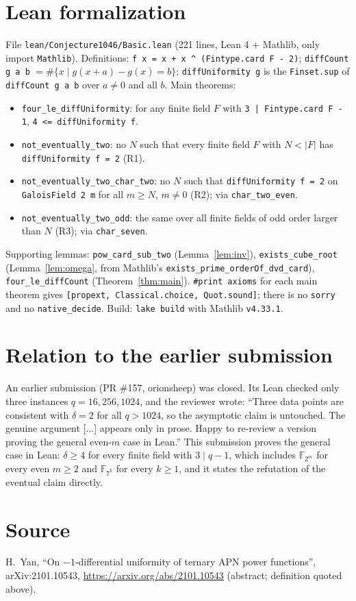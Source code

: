 \documentclass[11pt]{article}
\theoremstyle{definition}
\begin{document}
\section{Lean formalization}
File \texttt{lean/Conjecture1046/Basic.lean} (221 lines, Lean 4 + Mathlib, only import
\texttt{Mathlib}). Definitions: \texttt{f x = x + x \^{} (Fintype.card F - 2)};
\texttt{diffCount g a b} $=\#\{x\mid g(x+a)-g(x)=b\}$; \texttt{diffUniformity g} is the
\texttt{Finset.sup} of \texttt{diffCount g a b} over $a\ne0$ and all $b$. Main theorems:
\begin{itemize}
\item \texttt{four\_le\_diffUniformity}: for any finite field $F$ with
  \texttt{3 | Fintype.card F - 1}, \texttt{4 <= diffUniformity f}.
\item \texttt{not\_eventually\_two}: no $N$ such that every finite field $F$ with $N<|F|$ has
  \texttt{diffUniformity f = 2} (R1).
\item \texttt{not\_eventually\_two\_char\_two}: no $N$ such that \texttt{diffUniformity f = 2} on
  \texttt{GaloisField 2 m} for all $m\ge N$, $m\ne0$ (R2); via \texttt{char\_two\_even}.
\item \texttt{not\_eventually\_two\_odd}: the same over all finite fields of odd order larger than
  $N$ (R3); via \texttt{char\_seven}.
\end{itemize}
Supporting lemmas: \texttt{pow\_card\_sub\_two} (Lemma~\ref{lem:inv}), \texttt{exists\_cube\_root}
(Lemma~\ref{lem:omega}, from Mathlib's \texttt{exists\_prime\_orderOf\_dvd\_card}),
\texttt{four\_le\_diffCount} (Theorem~\ref{thm:main}). \texttt{\#print axioms} for each main
theorem gives \texttt{[propext, Classical.choice, Quot.sound]}; there is no \texttt{sorry} and
no \texttt{native\_decide}. Build: \texttt{lake build} with Mathlib \texttt{v4.33.1}.

\section{Relation to the earlier submission}
An earlier submission (PR \#157, orionsheep) was closed. Its Lean checked only three instances
$q=16,256,1024$, and the reviewer wrote: ``Three data points are consistent with $\delta = 2$ for
all $q > 1024$, so the asymptotic claim is untouched. The genuine argument [...] appears only in
prose. Happy to re-review a version proving the general even-$m$ case in Lean.'' This submission
proves the general case in Lean: $\delta\ge4$ for every finite field with $3\mid q-1$, which
includes $\mathbb F_{2^m}$ for every even $m\ge2$ and $\mathbb F_{7^k}$ for every $k\ge1$, and it
states the refutation of the eventual claim directly.

\section*{Source}
H.~Yan, ``On $-1$-differential uniformity of ternary APN power functions'', arXiv:2101.10543,
\url{https://arxiv.org/abs/2101.10543} (abstract; definition quoted above).
\end{document}
